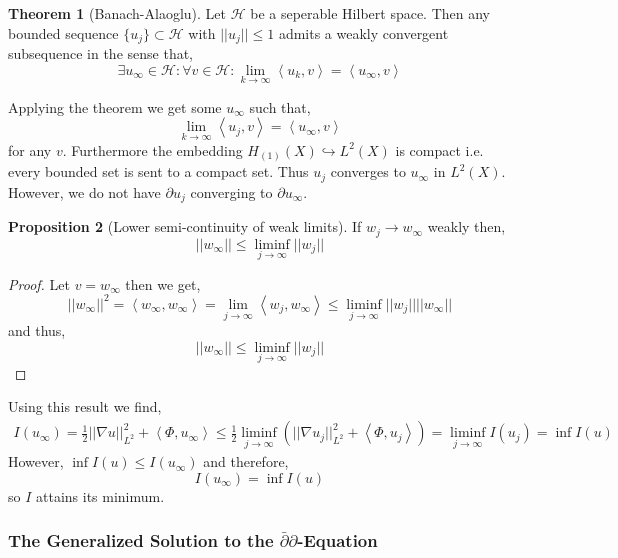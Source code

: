 \documentclass[12pt]{extarticle}
\theoremstyle{definition}
\newtheorem{theorem}{Theorem}[section]
\newtheorem{proposition}[theorem]{Proposition}
\begin{document}
\begin{theorem}[Banach-Alaoglu]
Let $\mathcal{H}$ be a seperable Hilbert space. Then any bounded sequence $\{ u_j \} \subset \mathcal{H}$ with $||u_j|| \le 1$ admits a weakly convergent subsequence in the sense that,
\[ \exists u_{\infty} \in \mathcal{H} : \forall v \in \mathcal{H} :  \lim_{k \to \infty} \left< u_{k}, v \right> = \left< u_{\infty}, v \right> \]
\end{theorem}
Applying the theorem we get some $u_{\infty}$ such that,
\[ \lim_{k \to \infty} \left< u_j, v \right> = \left< u_{\infty}, v \right> \]
for any $v$. Furthermore the embedding $H_{(1)}(X) \hookrightarrow L^2(X)$ is compact i.e. every bounded set is sent to a compact set. Thus $u_j$ converges to $u_{\infty}$ in $L^2(X)$. However, we do not have $\partial u_j$ converging to $\partial u_{\infty}$. 

\begin{proposition}[Lower semi-continuity of weak limits]
If $w_j \to w_{\infty}$ weakly then,
\[ ||w_{\infty} || \le \liminf_{j \to \infty} ||w_j|| \]
\end{proposition}

\begin{proof}
Let $v = w_{\infty}$ then we get,
\[ ||w_{\infty}||^2 = \left< w_{\infty}, w_{\infty} \right> = \lim_{j \to \infty} \left< w_{j}, w_{\infty} \right> \le \liminf_{j \to \infty} || w_j|| ||w_{\infty} || \]
and thus,
\[ ||w_{\infty}|| \le \liminf_{j \to \infty} || w_j || \]
\end{proof}
Using this result we find,
\begin{align*}
I(u_{\infty}) = \tfrac{1}{2} ||\nabla u||_{L^2}^2 + \left< \Phi, u_{\infty} \right> \le \tfrac{1}{2} \liminf_{j \to \infty} \left( || \nabla u_j ||_{L^2}^2 + \left< \Phi, u_j \right> \right) = \liminf_{j \to \infty} I(u_j) = \inf I(u) 
\end{align*}
However, $\inf I(u) \le I(u_{\infty})$ and therefore,
\[ I(u_{\infty}) = \inf I(u) \]
so $I$ attains its minimum. 

\subsubsection{The Generalized Solution to the $\bar{\partial} \partial$-Equation}
\end{document}
